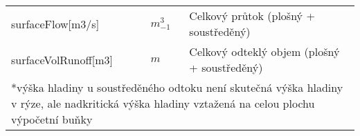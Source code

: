 \begin{table}[t]
\begin{tabular}{llp{}}
 surfaceFlow[m3/s]   &  $m^3_{-1}$ & Celkový průtok (plošný + soustředěný)  \\
 surfaceVolRunoff[m3]   &   $m$  & Celkový odteklý objem (plošný + soustředěný) \\
  \hline
   \hline
   \multicolumn{3}{p{\textwidth}}{*výška hladiny u soustředěného odtoku není skutečná výška hladiny v rýze, ale nadkritická výška hladiny vztažená na celou plochu výpočetní buňky}
 \end{tabular}

\end{table}
